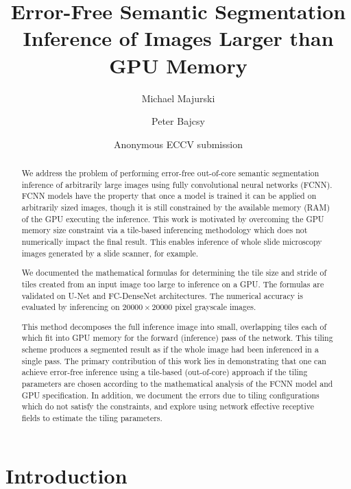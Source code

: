 \documentclass[runningheads]{llncs}
\title{Error-Free Semantic Segmentation Inference of Images Larger than GPU Memory}
\author{Michael Majurski\inst{1} \and Peter Bajcsy\inst{1}}
\institute{National Institute of Standards and Technology\\
	Information Technology Lab\\
	Gaithersburg, MD 20899, USA\\
	\email{\{michael.majurski,peter.bajcsy\}@nist.gov}}
\author{Anonymous ECCV submission}
\institute{Paper ID \ECCVSubNumber}
\begin{document}
\maketitle
 
\begin{abstract}

We address the problem of performing error-free out-of-core semantic segmentation inference of arbitrarily large images using fully convolutional neural networks (FCNN). FCNN models have the property that once a model is trained it can be applied on arbitrarily sized images, though it is still constrained by the available memory (RAM) of the GPU executing the inference. This work is motivated by overcoming the GPU memory size constraint via a tile-based inferencing methodology which does not numerically impact the final result. This enables inference of whole slide microscopy images generated by a slide scanner, for example.

We documented the mathematical formulas for determining the tile size and stride of tiles created from an input image too large to inference on a GPU. The formulas are validated on U-Net and FC-DenseNet architectures. The numerical accuracy is evaluated by inferencing on $\num{20000} \times \num{20000}$ pixel grayscale images. 

This method decomposes the full inference image into small, overlapping tiles each of which fit into GPU memory for the forward (inference) pass of the network. 
This tiling scheme produces a segmented result as if the whole image had been inferenced in a single pass. 
The primary contribution of this work lies in demonstrating that one can achieve error-free inference using a tile-based (out-of-core) approach if the tiling parameters are chosen according to the mathematical analysis of the FCNN model and GPU specification. 
In addition, we document the errors due to tiling configurations which do not satisfy the constraints, and explore using network effective receptive fields to estimate the tiling parameters. 

\end{abstract}

\section{Introduction}
\end{document}
